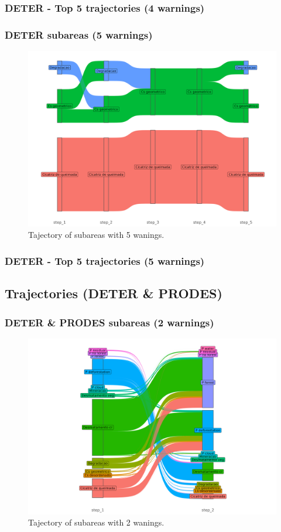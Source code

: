 \documentclass[aspectratio=169]{beamer}
\begin{document}
\begin{frame}[allowframebreaks]
    \frametitle{DETER - Top 5 trajectories (4 warnings)}
    
\end{frame}

\begin{frame}
    \frametitle{DETER subareas (5 warnings)}
    \begin{figure}[h] 
        \includegraphics[width=0.65\linewidth]
        {./figures/plot_deter_subarea_trajectory_5.png}
        \caption{Tajectory of subareas with 5 wanings.}
        \label{fig:deter_subarea_trajectory_5}
    \end{figure}
\end{frame}

\begin{frame}[allowframebreaks]
    \frametitle{DETER - Top 5 trajectories (5 warnings)}
    
\end{frame}



\subsection{Trajectories (DETER \& PRODES)} 

\begin{frame}
    \frametitle{DETER \& PRODES subareas (2 warnings)}
    \begin{figure}[h] 
        \includegraphics[width=0.65\linewidth]
        {./figures/plot_deter_prodes_subarea_trajectory_2.png}
        \caption{Tajectory of subareas with 2 wanings.}
        \label{fig:deter_prodes_subarea_trajectory_2}
    \end{figure}
\end{frame}
\end{document}
